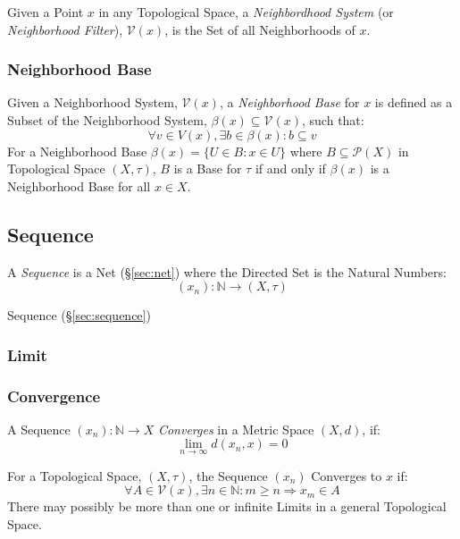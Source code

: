 Given a Point $x$ in any Topological Space, a \emph{Neighbordhood
  System} (or \emph{Neighborhood Filter}), $\mathcal{V}(x)$, is the
Set of all Neighborhoods of $x$.



\subsubsection{Neighborhood Base}\label{sec:neighborhood_base}

Given a Neighborhood System, $\mathcal{V}(x)$, a \emph{Neighborhood
  Base} for $x$ is defined as a Subset of the Neighborhood System,
$\beta(x) \subseteq \mathcal{V}(x)$, such that:
\[
  \forall v \in V(x), \exists b \in \beta(x) : b \subseteq v
\]
For a Neighborhood Base $\beta(x) = \{ U \in B : x \in U \}$ where $B
\subseteq \mathcal{P}(X)$ in Topological Space $(X,\tau)$, $B$ is a
Base for $\tau$ if and only if $\beta(x)$ is a Neighborhood Base for
all $x \in X$.



\subsection{Sequence}\label{sec:sequence_topology}

A \emph{Sequence} is a Net (\S\ref{sec:net}) where the Directed Set is
the Natural Numbers:
\[
  (x_n) : \mathbb{N} \rightarrow (X,\tau)
\]

Sequence (\S\ref{sec:sequence})



\subsubsection{Limit}\label{sec:limit_topology}

\subsubsection{Convergence}\label{sec:convergence_topology}

A Sequence $(x_n) : \mathbb{N} \rightarrow X$
\emph{Converges} in a Metric Space $(X,d)$, if:
\[
  \lim_{n \rightarrow \infty} d (x_n, x) = 0
\]

For a Topological Space, $(X,\tau)$, the Sequence $(x_n)$ Converges to
$x$ if:
\[
  \forall A \in \mathcal{V}(x), \exists n \in \mathbb{N}
  : m \geq n \Rightarrow x_m \in A
\]
There may possibly be more than one or infinite Limits in a general
Topological Space.

